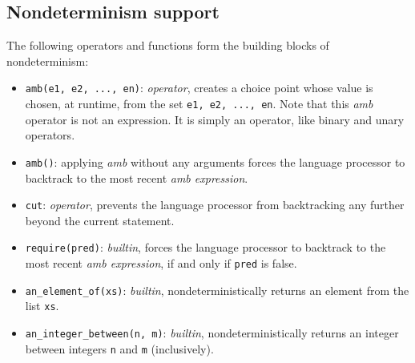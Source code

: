 \subsection*{Nondeterminism support}

The following operators and functions form the building blocks of nondeterminism:

\begin{itemize}
\item \lstinline{amb(e1, e2, ..., en)}: \textit{operator}, creates a choice point whose value is chosen, at runtime,
from the set \lstinline{e1, e2, ..., en}. Note that this \textit{amb} operator is not an expression. It is simply an operator, like binary and unary operators.
\item \lstinline{amb()}: applying \textit{amb} without any arguments forces the language processor to backtrack to the most recent \textit{amb expression}.
\item \lstinline{cut}: \textit{operator}, prevents the language processor from backtracking any further beyond the current statement.
\item \lstinline{require(pred)}: \textit{builtin}, forces the language processor to backtrack to the most recent \textit{amb expression}, if and only if \lstinline{pred} is false.
\item \lstinline{an_element_of(xs)}: \textit{builtin}, nondeterministically returns an element from the list \lstinline{xs}.
\item \lstinline{an_integer_between(n, m)}: \textit{builtin}, nondeterministically returns an integer between integers \lstinline{n} and \lstinline{m} (inclusively).
\end{itemize}
